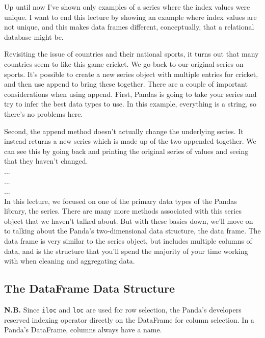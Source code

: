 \documentclass[11pt]{article}
\begin{document}
    \smallskip\smallskip\noindent
    Up until now I've shown only examples of a series where the index
    values were unique. I want to end this lecture by showing an example
    where index values are not unique, and this makes data frames
    different, conceptually, that a relational database might be. 

    Revisiting the issue of countries and their national sports, it
    turns out that many countries seem to like this game cricket. We go
    back to our original series on sports. It's possible to create a new
    series object with multiple entries for cricket, and then use append
    to bring these together. There are a couple of important
    considerations when using append. First, Pandas is going to take your
    series and try to infer the best data types to use. In this example,
    everything is a string, so there's no problems here.
    
    Second, the append method doesn't actually change the underlying
    series. It instead returns a new series which is made up of the two
    appended together. We can see this by going back and printing the
    original series of values and seeing that they haven't changed.\\
    ...\\
    ...\\
    ...\\

    \smallskip\smallskip\noindent
    In this lecture, we focused on one of the primary data types of
    the Pandas library, the series. There are many more methods associated
    with this series object that we haven't talked about. But with these
    basics down, we'll move on to talking about the Panda's
    two-dimensional data structure, the data frame. The data frame is very
    similar to the series object, but includes multiple columns of data,
    and is the structure that you'll spend the majority of your time
    working with when cleaning and aggregating data.  


    \subsection{The DataFrame Data Structure}
    \smallskip\smallskip\noindent
    {\bf N.B.} Since {\tt iloc} and {\tt loc} are used for row
    selection, the Panda's developers reserved indexing operator directly
    on the DataFrame for column selection. In a Panda's DataFrame, columns
    always have a name.
\end{document}
